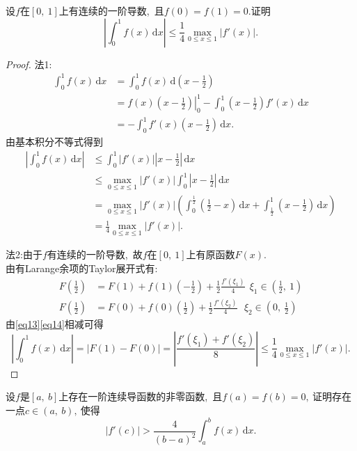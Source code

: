 	\newpage
	\begin{problem}
		设$f$在$\left[0,\ 1\right]$上有连续的一阶导数,\ 且$f(0)=f(1)=0.$证明
		$$\left|\int_{0}^{1}f(x)\,\text{d}x\right|\le \frac{1}{4}\max\limits_{0\le x\le 1}\left|f'(x)\right|.$$
	\end{problem}
	
	\begin{proof}
		法1:
		\begin{align*}
			\int_{0}^{1}f(x)\,\text{d}x&=\int_{0}^{1}f(x)\,\text{d}\left(x-\frac{1}{2}\right)\\
			&=f(x)\left.\left(x-\frac{1}{2}\right)\right|_0^1-\int_{0}^{1}\left(x-\frac{1}{2}\right)f'(x)\,\text{d}x\\
			&=-\int_{0}^{1}f'(x)\left(x-\frac{1}{2}\right)\,\text{d}x.
		\end{align*}
		由基本积分不等式得到
		\begin{align*}
			\left|\int_{0}^{1}f(x)\,\text{d}x\right|&\le \int_{0}^{1}\left|f'(x)\right|\left|x-\frac{1}{2}\right|\,\text{d}x\\
			&\le \max\limits_{0\le x\le 1}\left|f'(x)\right|\int_{0}^{1}\left|x-\frac{1}{2}\right|\,\text{d}x\\
			&=\max\limits_{0\le x\le 1}\left|f'(x)\right|\left(\int_{0}^{\frac{1}{2}}\left(\frac{1}{2}-x\right)\,\text{d}x+\int_{\frac{1}{2}}^{1}\left(x-\frac{1}{2}\right)\,\text{d}x\right)\\
			&=\frac{1}{4}\max\limits_{0\le x\le 1}\left|f'(x)\right|.
		\end{align*}
		
		法2:由于$f$有连续的一阶导数,\ 故$f$在$\left[0,\ 1\right]$上有原函数$F(x).$\\
		由有Larange余项的Taylor展开式有:
		\begin{align}
			F(\frac{1}{2})&=F(1)+f(1)\left(-\frac{1}{2}\right)+\frac{1}{2}\frac{f'(\xi_1)}{4}\ \ \xi_1 \in \left(\frac{1}{2},\ 1\right)\label{eq13}\\
			F(\frac{1}{2})&=F(0)+f(0)\left(\frac{1}{2}\right)+\frac{1}{2}\frac{f'(\xi_2)}{4}\ \ \ \xi_2 \in \left(0,\ \frac{1}{2}\right)\label{eq14}
		\end{align}
		由\eqref{eq13}\eqref{eq14}相减可得
		$$\left|\int_{0}^{1}f(x)\,\text{d}x\right|=\left|F(1)-F(0)\right|=\left|\frac{f'(\xi_1)+f'(\xi_2)}{8}\right|\le\frac{1}{4}\max\limits_{0\le x\le 1}\left|f'(x)\right|.$$ 
	\end{proof}
	\newpage
	\begin{problem}
		设$f$是$\left[a,\ b\right]$上存在一阶连续导函数的非零函数,\ 且$f(a)=f(b)=0,\ $证明存在一点$c\in\left(a,\ b\right),\ $使得
		$$\left|f'(c)\right|>\frac{4}{(b-a)^2}\int_{a}^{b}f(x)\,\text{d}x.$$
	\end{problem}
	

